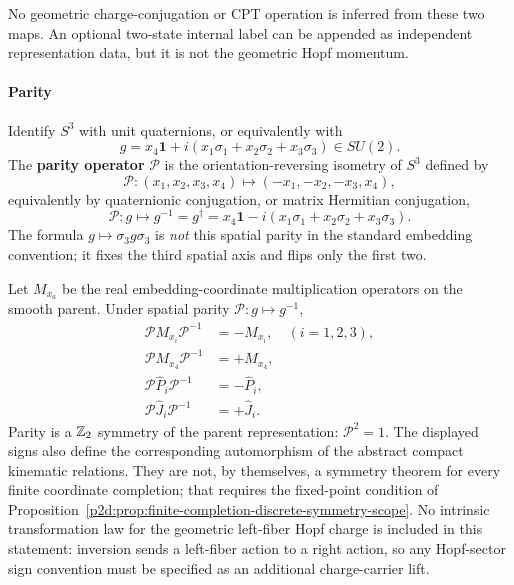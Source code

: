 \documentclass[12pt,a4paper]{article}
\begin{document}
No geometric charge-conjugation or CPT operation is inferred from these two
maps.  An optional two-state internal label can be appended as independent
representation data, but it is not the geometric Hopf momentum.

\paragraph{Parity}

\begin{definition}[Parity on $S^3$]
\label{p2:def:parity}
Identify \(S^3\) with unit quaternions, or equivalently with
\[
g=x_4\mathbf 1+i(x_1\sigma_1+x_2\sigma_2+x_3\sigma_3)\in SU(2).
\]
The \textbf{parity operator} $\mathcal{P}$ is the orientation-reversing isometry of $S^3$ defined by
\begin{equation}
\mathcal{P}: (x_1, x_2, x_3, x_4) \mapsto (-x_1, -x_2, -x_3, x_4),
\end{equation}
equivalently by quaternionic conjugation, or matrix Hermitian conjugation,
\begin{equation}
\mathcal{P}: g\mapsto g^{-1}=g^\dagger=x_4\mathbf 1-i(x_1\sigma_1+x_2\sigma_2+x_3\sigma_3).
\end{equation}
The formula \(g\mapsto\sigma_3g\sigma_3\) is \emph{not} this spatial parity in the standard embedding convention; it fixes the third spatial axis and flips only the first two.
\end{definition}


\begin{theorem}
\label{p2:thm:parity-action}
Let \(M_{x_a}\) be the real embedding-coordinate multiplication
operators on the smooth parent.  Under spatial parity
\(\mathcal P:g\mapsto g^{-1}\),
\begin{align}
\mathcal{P}M_{x_i}\mathcal{P}^{-1} &= -M_{x_i}, \quad (i = 1, 2, 3), \\
\mathcal{P}M_{x_4}\mathcal{P}^{-1} &= +M_{x_4}, \\
\mathcal{P}\hat{P}_i\mathcal{P}^{-1} &= -\hat{P}_i, \\
\mathcal{P}\hat{J}_i\mathcal{P}^{-1} &= +\hat{J}_i.
\end{align}
Parity is a \(\mathbb{Z}_2\) symmetry of the parent representation:
\(\mathcal{P}^2 = 1\).  The displayed signs also define the corresponding
automorphism of the abstract compact kinematic relations.  They are not, by
themselves, a symmetry theorem for every finite coordinate completion; that
requires the fixed-point condition of
Proposition~\ref{p2d:prop:finite-completion-discrete-symmetry-scope}.
No intrinsic
transformation law for the geometric left-fiber Hopf charge is included
in this statement: inversion sends a left-fiber action to a right action, so
any Hopf-sector sign convention must be specified as an additional
charge-carrier lift.
\end{theorem}
\end{document}
